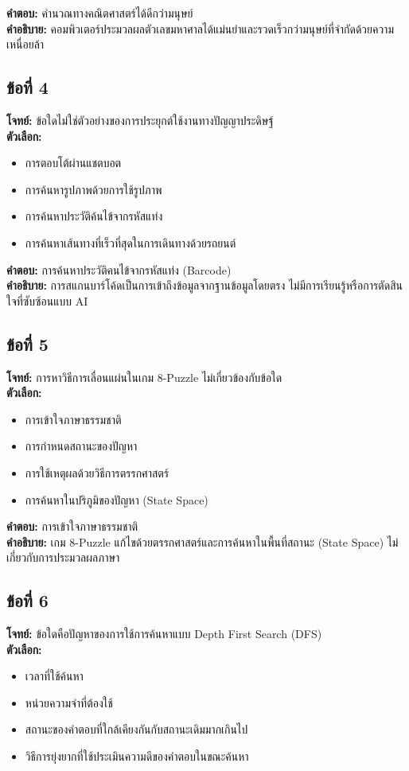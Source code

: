 \documentclass[12pt]{article}
\begin{document}
\textbf{คำตอบ:} คำนวณทางคณิตศาสตร์ได้ดีกว่ามนุษย์\\
\textbf{คำอธิบาย:} คอมพิวเตอร์ประมวลผลตัวเลขมหาศาลได้แม่นยำและรวดเร็วกว่ามนุษย์ที่จำกัดด้วยความเหนื่อยล้า

\subsection*{ข้อที่ 4}
\textbf{โจทย์:} ข้อใดไม่ใช่ตัวอย่างของการประยุกต์ใช้งานทางปัญญาประดิษฐ์\\
\textbf{ตัวเลือก:}
\begin{itemize}
    \item การตอบโต้ผ่านแชตบอต
    \item การค้นหารูปภาพด้วยการใช้รูปภาพ
    \item การค้นหาประวัติค้นไข้จากรหัสแท่ง
    \item การค้นหาเส้นทางที่เร็วที่สุดในการเดินทางด้วยรถยนต์
\end{itemize}

\textbf{คำตอบ:} การค้นหาประวัติคนไข้จากรหัสแท่ง (Barcode)\\
\textbf{คำอธิบาย:} การสแกนบาร์โค้ดเป็นการเข้าถึงข้อมูลจากฐานข้อมูลโดยตรง ไม่มีการเรียนรู้หรือการตัดสินใจที่ซับซ้อนแบบ AI

\subsection*{ข้อที่ 5}
\textbf{โจทย์:} การหาวิธีการเลื่อนแผ่นในเกม 8-Puzzle ไม่เกี่ยวข้องกับข้อใด\\
\textbf{ตัวเลือก:}
\begin{itemize}
    \item การเข้าใจภาษาธรรมชาติ
    \item การกำหนดสถานะของปัญหา
    \item การใช้เหตุผลด้วยวิธีการตรรกศาสตร์
    \item การค้นหาในปริภูมิของปัญหา (State Space)
\end{itemize}

\textbf{คำตอบ:} การเข้าใจภาษาธรรมชาติ\\
\textbf{คำอธิบาย:} เกม 8-Puzzle แก้ไขด้วยตรรกศาสตร์และการค้นหาในพื้นที่สถานะ (State Space) ไม่เกี่ยวกับการประมวลผลภาษา

\subsection*{ข้อที่ 6}
\textbf{โจทย์:} ข้อใดคือปัญหาของการใช้การค้นหาแบบ Depth First Search (DFS)\\
\textbf{ตัวเลือก:}
\begin{itemize}
    \item เวลาที่ใช้ค้นหา
    \item หน่วยความจำที่ต้องใช้
    \item สถานะของคำตอบที่ใกล้เคียงกันกับสถานะเดิมมากเกินไป
    \item วิธีการยุ่งยากที่ใช้ประเมินความดีของคำตอบในขณะค้นหา
\end{itemize}
\end{document}
